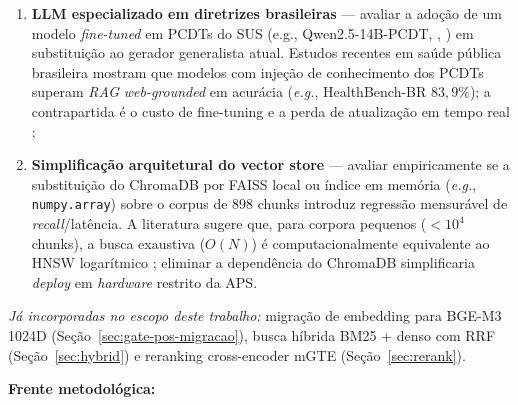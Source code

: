 \documentclass[
  12pt,
  oneside,
  a4paper,
  english,
  brazil
]{abntex2}
\begin{document}
\begin{enumerate}[label=\textbf{TF\arabic*}]
        comportamento conservador do gerador (a história de prompts v2--v4
        descrita no Apêndice~\ref{ape:prompt} mostra que prompts mais
        restritivos podem piorar a métrica RAGAS);
  \item \textbf{LLM especializado em diretrizes brasileiras} --- avaliar a
        adoção de um modelo \textit{fine-tuned} em PCDTs do SUS (e.g.,
        Qwen2.5-14B-PCDT, \citeauthor{teachingLLMsBrazil2026},
        \citeyear{teachingLLMsBrazil2026}) em substituição ao gerador
        generalista atual. Estudos recentes em saúde pública brasileira
        mostram que modelos com injeção de conhecimento dos PCDTs superam
        \textit{RAG} \textit{web-grounded} em acurácia
        (\textit{e.g.}, HealthBench-BR $83{,}9\%$); a contrapartida é o
        custo de fine-tuning e a perda de atualização em tempo
        real \cite{teachingLLMsBrazil2026};
  \item \textbf{Simplificação arquitetural do vector store} ---
        avaliar empiricamente se a substituição do ChromaDB por FAISS local
        ou índice em memória (\textit{e.g.}, \texttt{numpy.array}) sobre
        o corpus de 898 chunks introduz regressão mensurável de
        \textit{recall}/latência. A literatura sugere que, para corpora
        pequenos ($< 10^4$ chunks), a busca exaustiva
        ($O(N)$) é computacionalmente equivalente ao HNSW logarítmico
        \cite{ocaf2024}; eliminar a dependência do ChromaDB simplificaria
        \textit{deploy} em \textit{hardware} restrito da APS.
\end{enumerate}

\textit{Já incorporadas no escopo deste trabalho:} migração de
embedding para BGE-M3 1024D (Seção~\ref{sec:gate-pos-migracao}),
busca híbrida BM25 + denso com RRF (Seção~\ref{sec:hybrid}) e
reranking cross-encoder mGTE (Seção~\ref{sec:rerank}).

\textbf{Frente metodológica:}
\end{document}
